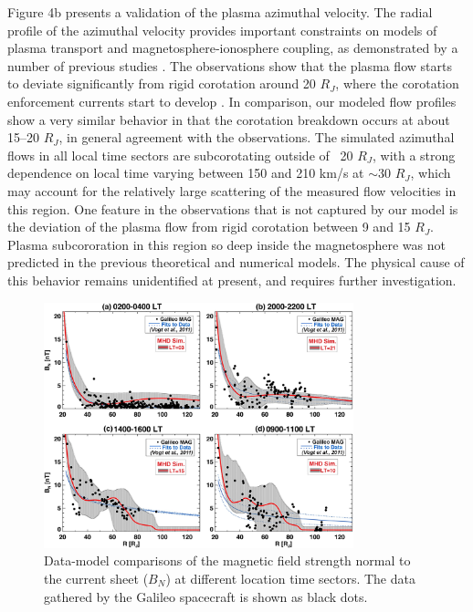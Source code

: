 Figure 4b presents a validation of the plasma azimuthal velocity. The radial profile of the azimuthal velocity provides important constraints on models of plasma transport and magnetosphere‐ionosphere coupling, as demonstrated by a number of previous studies \cite{Cowley2001a,Hill1979,Hill1980,Nichols2011,Nichols2004,Pontius1997}. The observations show that the plasma flow starts to deviate significantly from rigid corotation around 20 $R_J$, where the corotation enforcement currents start to develop \cite{Cowley2001a,Hill2001}. In comparison, our modeled flow profiles show a very similar behavior in that the corotation breakdown occurs at about 15–20 $R_J$, in general agreement with the observations. The simulated azimuthal flows in all local time sectors are subcorotating outside of ~20 $R_J$, with a strong dependence on local time varying between 150 and 210 km/s at $\sim$30 $R_J$, which may account for the relatively large scattering of the measured flow velocities in this region. One feature in the observations that is not captured by our model is the deviation of the plasma flow from rigid corotation between 9 and 15 $R_J$. Plasma subcororation in this region so deep inside the magnetosphere was not predicted in the previous theoretical and numerical models. The physical cause of this behavior remains unidentified at present, and requires further investigation.

\begin{figure}
    \centering
    \includegraphics[width=0.8\textwidth]{images2/comparison-magneticfield.jpg}
    \caption{Data-model comparisons of the magnetic field strength normal to the current sheet ($B_N$) at different location time sectors. The data gathered by the Galileo spacecraft is shown as black dots.}
    \label{fig:comparison-magneticfield}
\end{figure}

